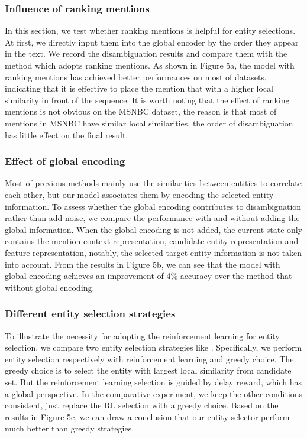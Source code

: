 \documentclass[sigconf]{acmart}
\begin{document}
\subsubsection*{Influence of ranking mentions}
In this section, we test whether ranking mentions is helpful for entity selections. At first, we directly input them into the global encoder by the order they appear in the text. We record the disambiguation results and compare them with the method which adopts ranking mentions. As shown in Figure 5a, the model with ranking mentions has achieved better performances on most of datasets, indicating that it is effective to place the mention that with a higher local similarity in front of the sequence. It is worth noting that the effect of ranking mentions is not obvious on the MSNBC dataset, the reason is that most of mentions in MSNBC have similar local similarities, the order of disambiguation has little effect on the final result. 


\subsubsection*{Effect of global encoding}
Most of previous methods mainly use the similarities between entities to correlate each other, but our model associates them by encoding the selected entity information. To assess whether the global encoding contributes to disambiguation rather than add noise, we compare the performance with and without adding the global information. When the global encoding is not added, the current state only contains the mention context representation, candidate entity representation and feature representation, notably, the selected target entity information is not taken into account. From the results in Figure 5b, we can see that the model with global encoding achieves an improvement of 4\% accuracy over the method that without global encoding.

\subsubsection*{Different entity selection strategies}
To illustrate the necessity for adopting the reinforcement learning for entity selection, we compare two entity selection strategies like \cite{FengHZYZ18}. Specifically, we perform entity selection respectively with reinforcement learning and greedy choice. The greedy choice is to select the entity with largest local similarity from candidate set. But the reinforcement learning selection is guided by delay reward, which has a global perspective. In the comparative experiment, we keep the other conditions consistent, just replace the RL selection with a greedy choice. Based on the results in Figure 5c, we can draw a conclusion that our entity selector perform much better than greedy strategies. 
\end{document}
